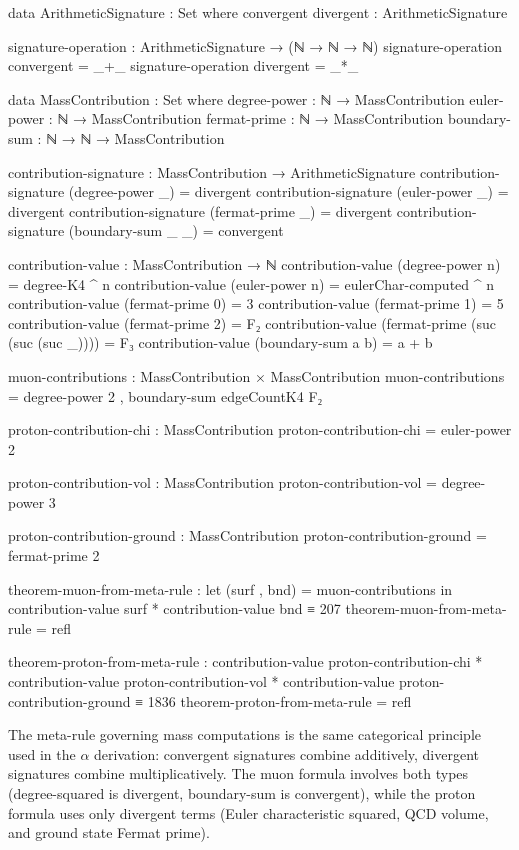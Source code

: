\documentclass[11pt,a4paper]{book}
\begin{document}
\begin{code}
data ArithmeticSignature : Set where
  convergent divergent : ArithmeticSignature

signature-operation : ArithmeticSignature → (ℕ → ℕ → ℕ)
signature-operation convergent = _+_
signature-operation divergent = _*_

data MassContribution : Set where
  degree-power : ℕ → MassContribution
  euler-power  : ℕ → MassContribution
  fermat-prime : ℕ → MassContribution
  boundary-sum : ℕ → ℕ → MassContribution

contribution-signature : MassContribution → ArithmeticSignature
contribution-signature (degree-power _) = divergent
contribution-signature (euler-power _)  = divergent
contribution-signature (fermat-prime _) = divergent
contribution-signature (boundary-sum _ _) = convergent

contribution-value : MassContribution → ℕ
contribution-value (degree-power n) = degree-K4 ^ n
contribution-value (euler-power n)  = eulerChar-computed ^ n
contribution-value (fermat-prime 0) = 3
contribution-value (fermat-prime 1) = 5
contribution-value (fermat-prime 2) = F₂
contribution-value (fermat-prime (suc (suc (suc _)))) = F₃
contribution-value (boundary-sum a b) = a + b

muon-contributions : MassContribution × MassContribution
muon-contributions = degree-power 2 , boundary-sum edgeCountK4 F₂

proton-contribution-chi : MassContribution
proton-contribution-chi = euler-power 2

proton-contribution-vol : MassContribution
proton-contribution-vol = degree-power 3

proton-contribution-ground : MassContribution
proton-contribution-ground = fermat-prime 2

theorem-muon-from-meta-rule : 
  let (surf , bnd) = muon-contributions
  in contribution-value surf * contribution-value bnd ≡ 207
theorem-muon-from-meta-rule = refl

theorem-proton-from-meta-rule :
  contribution-value proton-contribution-chi * 
  contribution-value proton-contribution-vol * 
  contribution-value proton-contribution-ground ≡ 1836
theorem-proton-from-meta-rule = refl
\end{code}

The meta-rule governing mass computations is the same categorical principle used in the $\alpha$ derivation: convergent signatures combine additively, divergent signatures combine multiplicatively. The muon formula involves both types (degree-squared is divergent, boundary-sum is convergent), while the proton formula uses only divergent terms (Euler characteristic squared, QCD volume, and ground state Fermat prime).
\end{document}
